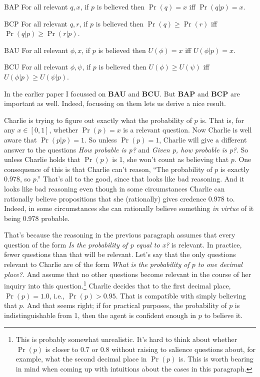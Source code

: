 \begin{description*}
\item[BAP] For all relevant $q, x$, if $p$ is believed then $\Pr(q) = x$ iff $\Pr(q | p) = x$.
\item[BCP] For all relevant $q, r$, if $p$ is believed then $\Pr(q) \geq \Pr(r)$ iff $\Pr(q | p) \geq \Pr(r | p)$.
\item[BAU] For all relevant $\phi, x$, if $p$ is believed then $U(\phi) = x$ iff $U(\phi | p) = x$.
\item[BCU] For all relevant $\phi, \psi$, if $p$ is believed then $U(\phi) \geq U(\psi)$ iff $U(\phi | p) \geq U(\psi | p)$.
\end{description*}

\noindent In the earlier paper I focussed on \textbf{BAU} and \textbf{BCU}. But \textbf{BAP} and \textbf{BCP} are important as well. Indeed, focussing on them lets us derive a nice result. 

Charlie is trying to figure out exactly what the probability of $p$ is. That is, for any $x \in [0, 1]$, whether $\Pr(p) = x$ is a relevant question. Now Charlie is well aware that $\Pr(p | p) = 1$. So unless $\Pr(p) = 1$, Charlie will give a different answer to the questions \textit{How probable is p?} and \textit{Given p, how probable is p?}. So unless Charlie holds that $\Pr(p)$ is 1, she won't count as believing that $p$. One consequence of this is that Charlie can't reason, ``The probability of $p$ is exactly 0.978, so $p$.'' That's all to the good, since that looks like bad reasoning. And it looks like bad reasoning even though in some circumstances Charlie can rationally believe propositions that she (rationally) gives credence 0.978 to. Indeed, in some circumstances she can rationally believe something \textit{in virtue} of it being 0.978 probable.

That's because the reasoning in the previous paragraph assumes that every question of the form \textit{Is the probability of p equal to x?} is relevant. In practice, fewer questions than that will be relevant. Let's say that the only questions relevant to Charlie are of the form \textit{What is the probability of $p$ to one decimal place?}. And assume that no other questions become relevant in the course of her inquiry into this question.\footnote{This is probably somewhat unrealistic. It's hard to think about whether $\Pr(p)$ is closer to 0.7 or 0.8 without raising to salience questions about, for example, what the second decimal place in $\Pr(p)$ is. This is worth bearing in mind when coming up with intuitions about the cases in this paragraph.} Charlie decides that to the first decimal place, $\Pr(p) = 1.0$, i.e., $\Pr(p) > 0.95$. That is compatible with simply believing that $p$. And that seems right; if for practical purposes, the probability of $p$ is indistinguishable from 1, then the agent is confident enough in $p$ to believe it.

